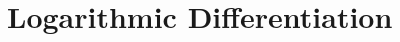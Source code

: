 \documentclass[main]{subfiles}
\begin{document}
\section{Logarithmic Differentiation} \label{ws1-5}






\end{document}
